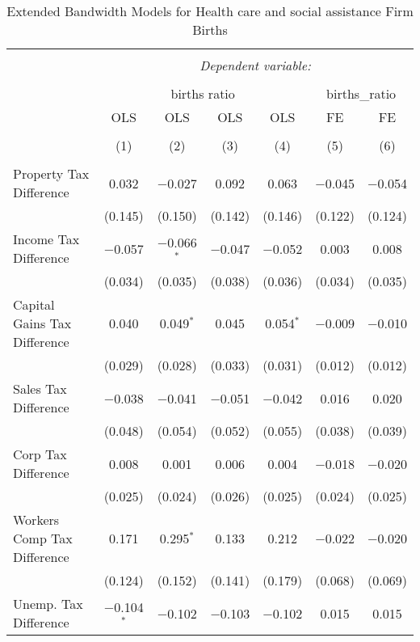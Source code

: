 
\begin{table}[!htbp] \centering 
  \caption{Extended Bandwidth Models for  Health care and social assistance Firm Births} 
  \label{62eb} 
\begin{tabular}{@{\extracolsep{5pt}}lcccccc} 
\\[-1.8ex]\hline 
\hline \\[-1.8ex] 
 & \multicolumn{6}{c}{\textit{Dependent variable:}} \\ 
\cline{2-7} 
\\[-1.8ex] & \multicolumn{4}{c}{births ratio} & \multicolumn{2}{c}{births\_ratio} \\ 
 & OLS & OLS & OLS & OLS & FE & FE \\ 
\\[-1.8ex] & (1) & (2) & (3) & (4) & (5) & (6)\\ 
\hline \\[-1.8ex] 
 Property Tax Difference & 0.032 & $-$0.027 & 0.092 & 0.063 & $-$0.045 & $-$0.054 \\ 
  & (0.145) & (0.150) & (0.142) & (0.146) & (0.122) & (0.124) \\ 
  Income Tax Difference & $-$0.057 & $-$0.066$^{*}$ & $-$0.047 & $-$0.052 & 0.003 & 0.008 \\ 
  & (0.034) & (0.035) & (0.038) & (0.036) & (0.034) & (0.035) \\ 
  Capital Gains Tax Difference & 0.040 & 0.049$^{*}$ & 0.045 & 0.054$^{*}$ & $-$0.009 & $-$0.010 \\ 
  & (0.029) & (0.028) & (0.033) & (0.031) & (0.012) & (0.012) \\ 
  Sales Tax Difference & $-$0.038 & $-$0.041 & $-$0.051 & $-$0.042 & 0.016 & 0.020 \\ 
  & (0.048) & (0.054) & (0.052) & (0.055) & (0.038) & (0.039) \\ 
  Corp Tax Difference & 0.008 & 0.001 & 0.006 & 0.004 & $-$0.018 & $-$0.020 \\ 
  & (0.025) & (0.024) & (0.026) & (0.025) & (0.024) & (0.025) \\ 
  Workers Comp Tax Difference & 0.171 & 0.295$^{*}$ & 0.133 & 0.212 & $-$0.022 & $-$0.020 \\ 
  & (0.124) & (0.152) & (0.141) & (0.179) & (0.068) & (0.069) \\ 
  Unemp. Tax Difference & $-$0.104$^{*}$ & $-$0.102 & $-$0.103 & $-$0.102 & 0.015 & 0.015 \\ 

\end{tabular}
\end{table}
